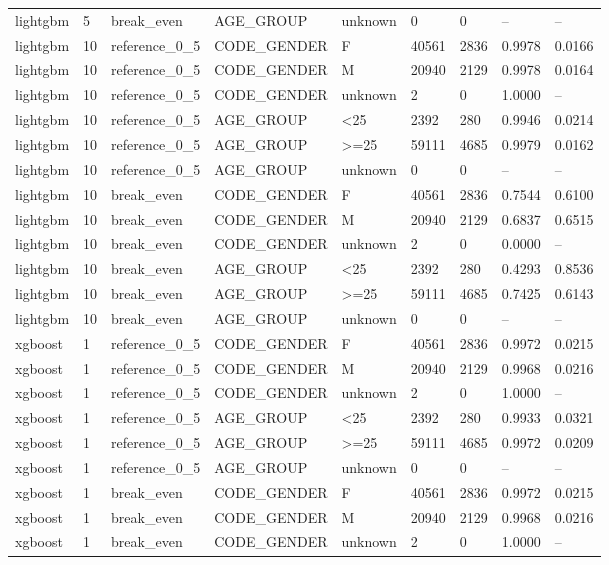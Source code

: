 \begin{longtable}{lllllllll}
lightgbm & 5 & break\_even & AGE\_GROUP & unknown & 0 & 0 & -- & -- \\
lightgbm & 10 & reference\_0\_5 & CODE\_GENDER & F & 40561 & 2836 & 0.9978 & 0.0166 \\
lightgbm & 10 & reference\_0\_5 & CODE\_GENDER & M & 20940 & 2129 & 0.9978 & 0.0164 \\
lightgbm & 10 & reference\_0\_5 & CODE\_GENDER & unknown & 2 & 0 & 1.0000 & -- \\
lightgbm & 10 & reference\_0\_5 & AGE\_GROUP & <25 & 2392 & 280 & 0.9946 & 0.0214 \\
lightgbm & 10 & reference\_0\_5 & AGE\_GROUP & >=25 & 59111 & 4685 & 0.9979 & 0.0162 \\
lightgbm & 10 & reference\_0\_5 & AGE\_GROUP & unknown & 0 & 0 & -- & -- \\
lightgbm & 10 & break\_even & CODE\_GENDER & F & 40561 & 2836 & 0.7544 & 0.6100 \\
lightgbm & 10 & break\_even & CODE\_GENDER & M & 20940 & 2129 & 0.6837 & 0.6515 \\
lightgbm & 10 & break\_even & CODE\_GENDER & unknown & 2 & 0 & 0.0000 & -- \\
lightgbm & 10 & break\_even & AGE\_GROUP & <25 & 2392 & 280 & 0.4293 & 0.8536 \\
lightgbm & 10 & break\_even & AGE\_GROUP & >=25 & 59111 & 4685 & 0.7425 & 0.6143 \\
lightgbm & 10 & break\_even & AGE\_GROUP & unknown & 0 & 0 & -- & -- \\
xgboost & 1 & reference\_0\_5 & CODE\_GENDER & F & 40561 & 2836 & 0.9972 & 0.0215 \\
xgboost & 1 & reference\_0\_5 & CODE\_GENDER & M & 20940 & 2129 & 0.9968 & 0.0216 \\
xgboost & 1 & reference\_0\_5 & CODE\_GENDER & unknown & 2 & 0 & 1.0000 & -- \\
xgboost & 1 & reference\_0\_5 & AGE\_GROUP & <25 & 2392 & 280 & 0.9933 & 0.0321 \\
xgboost & 1 & reference\_0\_5 & AGE\_GROUP & >=25 & 59111 & 4685 & 0.9972 & 0.0209 \\
xgboost & 1 & reference\_0\_5 & AGE\_GROUP & unknown & 0 & 0 & -- & -- \\
xgboost & 1 & break\_even & CODE\_GENDER & F & 40561 & 2836 & 0.9972 & 0.0215 \\
xgboost & 1 & break\_even & CODE\_GENDER & M & 20940 & 2129 & 0.9968 & 0.0216 \\
xgboost & 1 & break\_even & CODE\_GENDER & unknown & 2 & 0 & 1.0000 & -- \\

\end{longtable}
